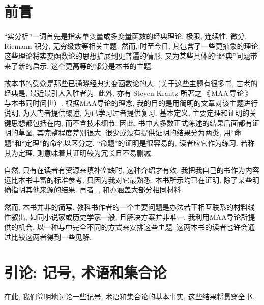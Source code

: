 \documentclass[twoside, fontset=fandol, punct=kaiming]{ctexbook}
\theoremstyle{innocent}
\begin{document}
\begin{titlepage}
\end{titlepage}
\chapter*{前言}
``实分析''一词首先是指实单变量或多变量函数的经典理论: 极限, 连续性, 微分, Riemann 积分, 无穷级数等相关主题. 然而, 时至今日, 其包含了一些更抽象的理论, 这些理论将实变函数论的思想扩展到更普遍的情形, 又为某些具体的``经典''问题带来了新的启示. 这个更高等的部分是本书的主题.

故本书的受众是那些已通晓经典实变函数论的人. (关于这些主题有很多书, 古老的经典是\cite{rudin1976principles}, 最近最引人入胜者为\cite{korner2004companion}. 此外, 亦有 Steven Krantz 所著之\,《\,MAA\,导论\,》\,\cite{krantz2014guide}与本书同时问世）. 根据MAA导论的理念, 我的目的是用简明的文章对该主题进行说明, 为入门者提供概述, 为已学习过者提供复习. 基本定义, 主要定理和证明的关键思想都包括在内, 而不含技术细节. 因此, 书中大多数正式陈述的结果后面都有证明的草图, 其完整程度差别很大. 很少或没有提供证明的结果分为两类, 用``命题''和``定理''的命名以区分之. ``命题''的证明是很容易的, 读者应它作为练习. 若称其为定理, 则意味着其证明较为冗长且不易删减.

自然, 只有在读者有资源来填补空缺时, 这种介绍才有效. 我把我自己的书\cite{folland1999real}作为内容远比本书丰富的标准参考, 只因为我对它最熟悉. 本书所示均已在\cite{folland1999real}证明, 除了某些明确指明其他来源的结果. 再者, \cite{lang2012real}, \cite{royden1988real}和\cite{rudin1987realcomplex}亦涵盖大部分相同材料.

然而, 本书并非\cite{folland1999real}的简写. 教科书作者的一个主要问题是办法若干相互联系的材料线性叙出, 如同小说家或历史学家一般, 且解决方案并非唯一. 我利用MAA导论所提供的机会, 以一种与\cite{folland1999real}中完全不同的方式来安排这些主题. 这两本书的读者也许会通过比较这两者得到一些见解.


\chapter{引论: 记号, 术语和集合论}
在此, 我们简明地讨论一些记号, 术语和集合论的基本事实, 这些结果将贯穿全书.
\end{document}
